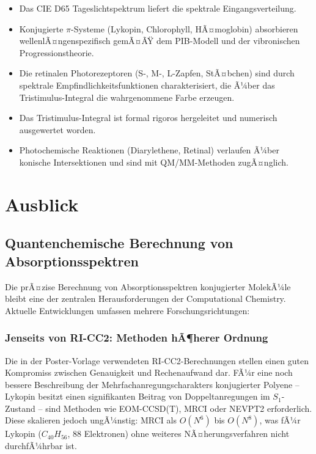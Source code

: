 ﻿\documentclass[a4paper,12pt]{article}
\theoremstyle{definition}
\begin{document}
\begin{itemize}
  \item Das CIE D65 Tageslichtspektrum liefert die spektrale Eingangsverteilung.
  \item Konjugierte $\pi$-Systeme (Lykopin, Chlorophyll, HÃ¤moglobin) absorbieren
        wellenlÃ¤ngenspezifisch gemÃ¤ÃŸ dem PIB-Modell und der vibronischen Progressionstheorie.
  \item Die retinalen Photorezeptoren (S-, M-, L-Zapfen, StÃ¤bchen) sind durch
        spektrale Empfindlichkeitsfunktionen charakterisiert, die Ã¼ber das
        Tristimulus-Integral die wahrgenommene Farbe erzeugen.
  \item Das Tristimulus-Integral ist formal rigoros hergeleitet und numerisch
        ausgewertet worden.
  \item Photochemische Reaktionen (Diarylethene, Retinal) verlaufen Ã¼ber
        konische Intersektionen und sind mit QM/MM-Methoden zugÃ¤nglich.
\end{itemize}

\section{Ausblick}

\subsection{Quantenchemische Berechnung von Absorptionsspektren}

Die prÃ¤zise Berechnung von Absorptionsspektren konjugierter MolekÃ¼le bleibt eine
der zentralen Herausforderungen der Computational Chemistry. Aktuelle Entwicklungen
umfassen mehrere Forschungsrichtungen:

\subsubsection{Jenseits von RI-CC2: Methoden hÃ¶herer Ordnung}

Die in der Poster-Vorlage verwendeten RI-CC2-Berechnungen \cite{vollbrecht2014}
stellen einen guten Kompromiss zwischen Genauigkeit und Rechenaufwand dar.
FÃ¼r eine noch bessere Beschreibung der Mehrfachanregungscharakters konjugierter
Polyene -- Lykopin besitzt einen signifikanten Beitrag von Doppeltanregungen
im $S_1$-Zustand \cite{tavan1987} -- sind Methoden wie EOM-CCSD(T),
MRCI oder NEVPT2 erforderlich. Diese skalieren jedoch ungÃ¼nstig:
MRCI als $O(N^6)$ bis $O(N^8)$, was fÃ¼r Lykopin ($C_{40}H_{56}$, 88 Elektronen)
ohne weiteres NÃ¤herungsverfahren nicht durchfÃ¼hrbar ist.
\end{document}
